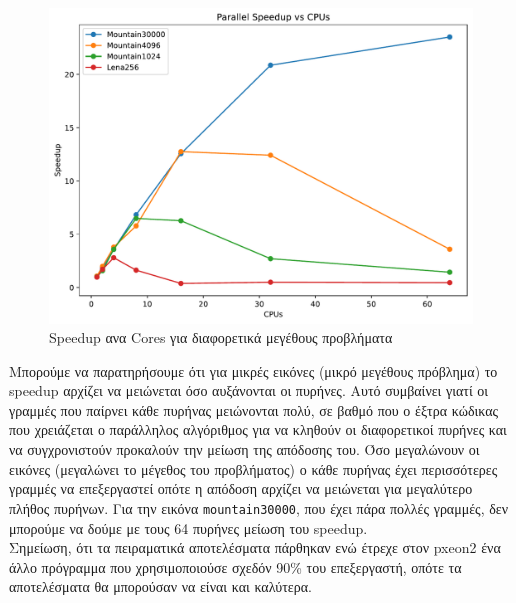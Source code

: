 \begin{figure}[H]
    \centering
    \includegraphics[width=0.8\linewidth]{./pics/speedupPlot.pdf}
    \caption{Speedup ανα Cores για διαφορετικά μεγέθους προβλήματα}
\end{figure}

Μπορούμε να παρατηρήσουμε ότι για μικρές εικόνες (μικρό μεγέθους πρόβλημα) το speedup αρχίζει να μειώνεται όσο αυξάνονται οι πυρήνες. Αυτό συμβαίνει γιατί οι γραμμές που παίρνει κάθε πυρήνας μειώνονται πολύ, σε βαθμό που ο έξτρα κώδικας που χρειάζεται ο παράλληλος αλγόριθμος για να κληθούν οι διαφορετικοί πυρήνες και να συγχρονιστούν προκαλούν την μείωση της απόδοσης του. Όσο μεγαλώνουν οι εικόνες (μεγαλώνει το μέγεθος του προβλήματος) ο κάθε πυρήνας έχει περισσότερες γραμμές να επεξεργαστεί οπότε η απόδοση αρχίζει να μειώνεται για μεγαλύτερο πλήθος πυρήνων. Για την εικόνα \verb|mountain30000|, που έχει πάρα πολλές γραμμές, δεν μπορούμε να δούμε με τους 64 πυρήνες μείωση του speedup.\\

Σημείωση, ότι τα πειραματικά αποτελέσματα πάρθηκαν ενώ έτρεχε στον pxeon2 ένα άλλο πρόγραμμα που χρησιμοποιούσε σχεδόν 90\% του επεξεργαστή, οπότε τα αποτελέσματα θα μπορούσαν να είναι και καλύτερα.
